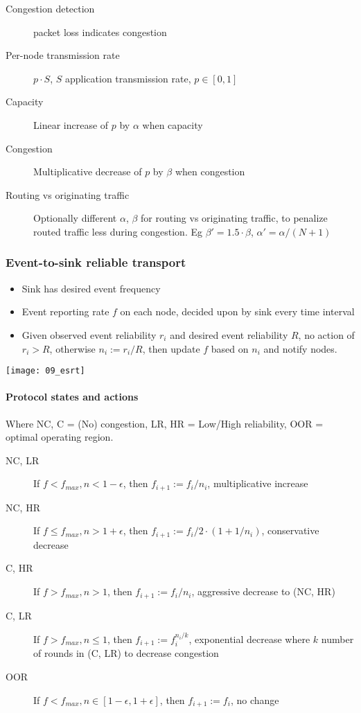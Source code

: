 \begin{description}
		\item[Congestion detection] packet loss indicates congestion
		\item[Per-node transmission rate] $p \cdot S$, $S$ application transmission rate, $p \in [0, 1]$
		\item[Capacity] Linear increase of $p$ by $\alpha$ when capacity
		\item[Congestion] Multiplicative decrease of $p$ by $\beta$ when congestion
		\item[Routing vs originating traffic] Optionally different $\alpha$,
				$\beta$ for routing vs originating traffic, to penalize routed
				traffic less during congestion. Eg $\beta' = 1.5 \cdot \beta$,
				$\alpha' = \alpha / (N + 1)$
\end{description}

\subsubsection{Event-to-sink reliable transport}

\begin{itemize}
		\item Sink has desired event frequency
		\item Event reporting rate $f$ on each node, decided upon by sink every time interval
		\item Given observed event reliability $r_i$ and desired event
				reliability $R$, no action of $r_i > R$, otherwise $n_i := r_i
				/ R$, then update $f$ based on $n_i$ and notify nodes.
\end{itemize}

\texttt{[image: 09\_esrt]}

\paragraph{Protocol states and actions}

Where NC, C = (No) congestion, LR, HR = Low/High reliability, OOR = optimal operating region.

\begin{description}
		\item[NC, LR] If $f < f_{max}, n < 1 - \epsilon$, then $f_{i+1} := f_{i} / n_i$, multiplicative increase
		\item[NC, HR] If $f \leq f_{max}, n > 1 + \epsilon$, then $f_{i+1} := f_i / 2 \cdot (1 + 1/n_i)$, conservative decrease
		\item[C, HR] If $f > f_{max}, n > 1$, then  $f_{i+1} := f_i / n_i$, aggressive decrease to (NC, HR)
		\item[C, LR] If $f > f_{max}, n \leq 1$, then $f_{i+1} := f_i^{n_i / k}$, exponential decrease where $k$ number of rounds in (C, LR) to decrease congestion
		\item[OOR] If $f < f_{max}, n \in [1 - \epsilon, 1 + \epsilon]$, then $f_{i + 1} := f_i$, no change
\end{description}


